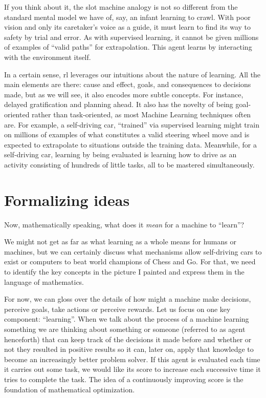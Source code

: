 If you think about it, the slot machine analogy is not so different from the
standard mental model we have of, say, an infant learning to crawl. With poor
vision and only its caretaker's voice as a guide, it must learn to find its way
to safety by trial and error. As with supervised learning, it cannot be given
millions of examples of ``valid paths'' for extrapolation. This agent learns by
interacting with the environment itself.

In a certain sense, \ac{rl} leverages our intuitions about the nature of
learning.  All the main elements are there: cause and effect, goals, and
consequences to decisions made, but as we will see, it also encodes more subtle
concepts. For instance, delayed gratification and planning ahead. It also has
the novelty of being goal-oriented rather than task-oriented, as most Machine
Learning techniques often are. For example, a self-driving car, ``trained'' via
supervised learning might train on millions of examples of what constitutes a
valid steering wheel move and is expected to extrapolate to situations outside
the training data. Meanwhile, for a self-driving car, learning by being
evaluated is learning how to drive as an activity consisting of hundreds of
little tasks, all to be mastered simultaneously.

\section{Formalizing ideas}

Now, mathematically speaking, what does it \textit{mean} for a 
machine to ``learn''?

We might not get as far as what learning as a whole means for humans or
machines, but we can certainly discuss what mechanisms allow self-driving cars
to exist or computers to beat world champions of Chess and Go. For that, we need
to identify the key concepts in the picture I painted and express them in the
language of mathematics.

For now, we can gloss over the details of how might a machine make decisions,
perceive goals, take actions or perceive rewards. Let us focus on one key
component: ``learning''.  When we talk about the process of a machine learning
something we are thinking about something or someone (referred to as agent
henceforth) that can keep track of the decisions it made before and whether or
not they resulted in positive results so it can, later on, apply that knowledge
to become an increasingly better problem solver. If this agent is evaluated each
time it carries out some task, we would like its score to increase each
successive time it tries to complete the task.  The idea of a continuously
improving score is the foundation of mathematical optimization.

